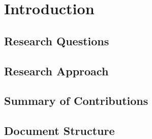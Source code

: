 \chapter{Introduction}

\section{Research Questions}

\section{Research Approach}
\label{sec:ResearchApproach}

\section{Summary of Contributions}

\section{Document Structure}